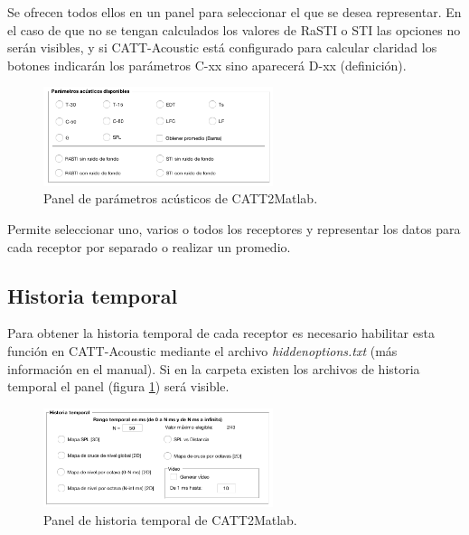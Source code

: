 Se ofrecen todos ellos en un panel para seleccionar el que se desea representar. En el caso de que no se tengan calculados los valores de RaSTI o STI las opciones no serán visibles, y si CATT-Acoustic está configurado para calcular claridad los botones indicarán los parámetros C-xx sino aparecerá D-xx (definición).

\begin{figure}[ht]
    \centering
    \includegraphics[width=0.6\textwidth]{archivos/capturas/catt2matlabparam}
    \caption{Panel de parámetros acústicos de CATT2Matlab.}
\end{figure}
\FloatBarrier

Permite seleccionar uno, varios o todos los receptores y representar los datos para cada receptor por separado o realizar un promedio.

\subsection{Historia temporal}

Para obtener la historia temporal de cada receptor es necesario habilitar esta función en CATT-Acoustic mediante el archivo \textit{hiddenoptions.txt} (más información en el manual). Si en la carpeta existen los archivos de historia temporal el panel (figura \ref{paneltemporal}) será visible.

\begin{figure}[ht]
    \centering
    \includegraphics[width=0.6\textwidth]{archivos/capturas/catt2matlabtemporal}
    \caption{Panel de historia temporal de CATT2Matlab.}
    \label{paneltemporal}
\end{figure}
\FloatBarrier

